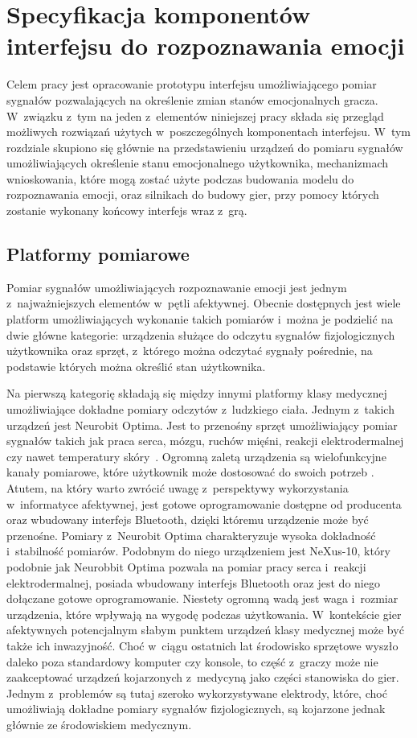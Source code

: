 \chapter{Specyfikacja komponentów interfejsu do rozpoznawania emocji}
\label{cha:specyfikacja}
Celem pracy jest opracowanie prototypu interfejsu umożliwiającego pomiar sygnałów pozwalających na określenie zmian stanów emocjonalnych gracza. W~związku z~tym na jeden z~elementów niniejszej pracy składa się przegląd możliwych rozwiązań użytych w~poszczególnych komponentach interfejsu. W~tym rozdziale skupiono się głównie na przedstawieniu urządzeń do pomiaru sygnałów umożliwiających określenie stanu emocjonalnego użytkownika, mechanizmach wnioskowania, które mogą zostać użyte podczas budowania modelu do rozpoznawania emocji, oraz silnikach do budowy gier, przy pomocy których zostanie wykonany końcowy interfejs wraz z~grą.

\section{Platformy pomiarowe}
Pomiar sygnałów umożliwiających rozpoznawanie emocji jest jednym z~najważniejszych elementów w~pętli afektywnej. Obecnie dostępnych jest wiele platform umożliwiających wykonanie takich pomiarów i~można je podzielić na dwie główne kategorie: urządzenia służące do odczytu sygnałów fizjologicznych użytkownika oraz sprzęt, z~którego można odczytać sygnały pośrednie, na podstawie których można określić stan użytkownika.

Na pierwszą kategorię składają się między innymi platformy klasy medycznej umożliwiające dokładne pomiary odczytów z~ludzkiego ciała. Jednym z~takich urządzeń jest Neurobit Optima. Jest to przenośny sprzęt umożliwiający pomiar sygnałów takich jak praca serca, mózgu, ruchów mięśni, reakcji elektrodermalnej czy nawet temperatury skóry~\cite{neurobit_manual}. Ogromną zaletą urządzenia są wielofunkcyjne kanały pomiarowe, które użytkownik może dostosować do swoich potrzeb \cite{neurobit_manual}. Atutem, na który warto zwrócić uwagę z~perspektywy wykorzystania w~informatyce afektywnej, jest gotowe oprogramowanie dostępne od producenta oraz wbudowany interfejs Bluetooth, dzięki któremu urządzenie może być przenośne. Pomiary z~Neurobit Optima charakteryzuje wysoka dokładność i~stabilność pomiarów. Podobnym do niego urządzeniem jest NeXus-10, który podobnie jak Neurobbit Optima pozwala na pomiar pracy serca i~reakcji elektrodermalnej, posiada wbudowany interfejs Bluetooth oraz jest do niego dołączane gotowe oprogramowanie. Niestety ogromną wadą jest waga i~rozmiar urządzenia, które wpływają na wygodę podczas użytkowania. W~kontekście gier afektywnych potencjalnym słabym punktem urządzeń klasy medycznej może być także ich inwazyjność. Choć w~ciągu ostatnich lat środowisko sprzętowe wyszło daleko poza standardowy komputer czy konsole, to część z~graczy może nie zaakceptować urządzeń kojarzonych z~medycyną jako części stanowiska do gier. Jednym z~problemów są tutaj szeroko wykorzystywane elektrody, które, choć umożliwiają dokładne pomiary sygnałów fizjologicznych, są kojarzone jednak głównie ze środowiskiem medycznym.

